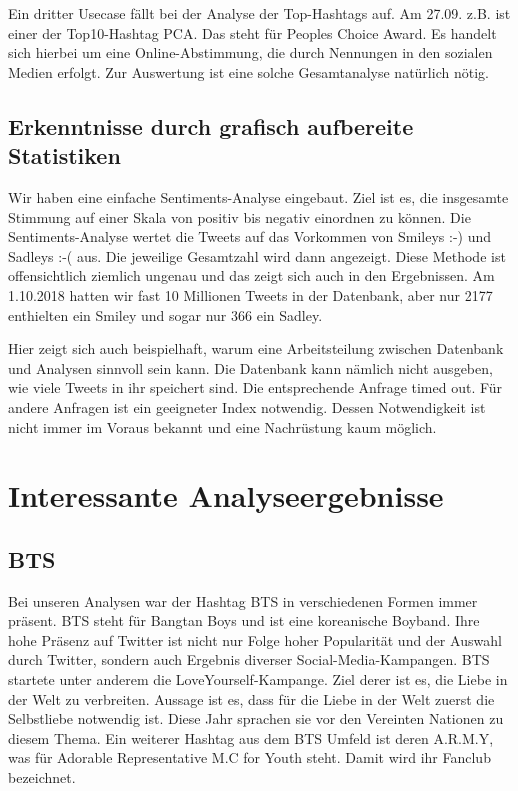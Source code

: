 Ein dritter Usecase fällt bei der Analyse der Top-Hashtags auf. Am
27.09. z.B. ist einer der Top10-Hashtag PCA. Das steht für
Peoples Choice Award. Es handelt sich hierbei um eine
Online-Abstimmung, die durch Nennungen in den sozialen Medien erfolgt.
Zur Auswertung ist eine solche Gesamtanalyse natürlich nötig.

\subsection{Erkenntnisse durch grafisch
aufbereite Statistiken}
Wir haben eine einfache Sentiments-Analyse eingebaut. Ziel ist es, die
insgesamte Stimmung auf einer Skala von positiv bis negativ einordnen
zu können. Die Sentiments-Analyse wertet die Tweets auf das Vorkommen
von Smileys :-) und Sadleys :-( aus. Die jeweilige Gesamtzahl wird dann
angezeigt. Diese Methode ist offensichtlich ziemlich ungenau und das
zeigt sich auch in den Ergebnissen. Am 1.10.2018 hatten wir fast 10
Millionen Tweets in der Datenbank, aber nur 2177 enthielten ein Smiley
und sogar nur 366 ein Sadley.

Hier zeigt sich auch beispielhaft, warum eine Arbeitsteilung zwischen
Datenbank und Analysen sinnvoll sein kann. Die Datenbank kann nämlich
nicht ausgeben, wie viele Tweets in ihr speichert sind. Die
entsprechende Anfrage timed out. Für andere Anfragen ist ein geeigneter
Index notwendig. Dessen Notwendigkeit ist nicht immer im Voraus bekannt
und eine Nachrüstung kaum möglich.

\section{Interessante Analyseergebnisse}
\subsection{BTS}
Bei unseren Analysen war der Hashtag BTS in verschiedenen Formen immer
präsent. BTS steht für Bangtan Boys und ist eine koreanische Boyband.
Ihre hohe Präsenz auf Twitter ist nicht nur Folge hoher Popularität und
der Auswahl durch Twitter, sondern auch Ergebnis diverser
Social-Media-Kampangen. BTS startete unter anderem die
LoveYourself-Kampange. Ziel derer ist es, die Liebe in der Welt zu
verbreiten. Aussage ist es, dass für die Liebe in der Welt zuerst die
Selbstliebe notwendig ist. Diese Jahr sprachen sie vor den Vereinten
Nationen zu diesem Thema. Ein weiterer Hashtag aus dem BTS Umfeld ist
deren A.R.M.Y, was für Adorable Representative M.C for Youth steht.
Damit wird ihr Fanclub bezeichnet.

